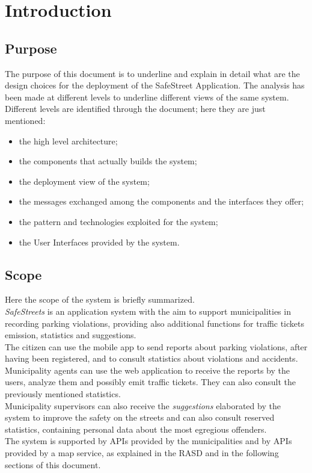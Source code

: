 \documentclass[a4paper]{report}
\begin{document}
\tableofcontents
\listoffigures
\begingroup
\let\clearpage\relax %
\listoftables
\endgroup
\restoregeometry

\chapter{Introduction}
\section{Purpose}

The purpose of this document is to underline and explain in detail what are the design choices for the deployment of the SafeStreet Application.  The analysis has been made at different levels to underline different views of the same system.
Different levels are identified through the document; here they are just mentioned:
\begin{itemize}
\item the high level architecture;
\item the components that actually builds the system;
\item the deployment view of the system;
\item the messages exchanged among the components and the interfaces they offer;
\item the pattern and technologies exploited for the system;
\item the User Interfaces provided by the system.
\end{itemize}

\section{Scope}
Here the scope of the system is briefly summarized.\\
\textit{SafeStreets} is an application system with the aim to support municipalities in recording parking violations, providing also additional functions for traffic tickets emission, statistics and suggestions.\\
The citizen can use the mobile app to send reports about parking violations, after having been registered, and to consult statistics about violations and accidents.\\
Municipality agents can use the web application to receive the reports by the users, analyze them and possibly emit traffic tickets. They can also consult the previously mentioned statistics.\\
Municipality supervisors can also receive the \textit{suggestions} elaborated by the system to improve the safety on the streets and can also consult reserved statistics, containing personal data about the most egregious offenders.\\
The system is supported by APIs provided by the municipalities and by APIs provided by a map service, as explained in the RASD and in the following sections of this document.
\end{document}

